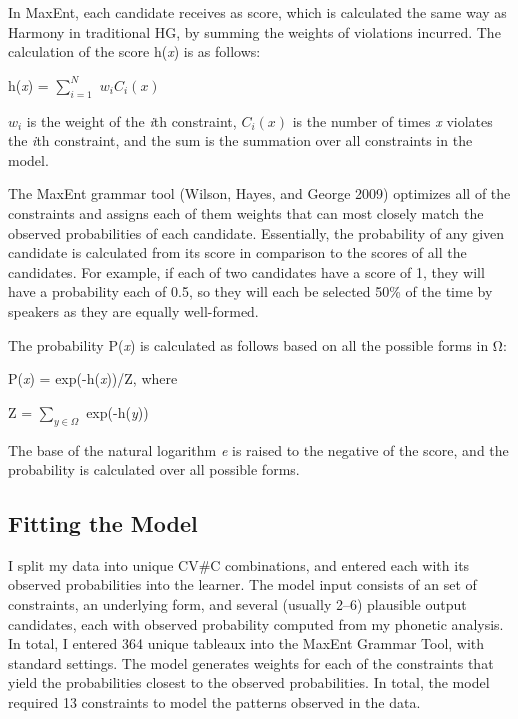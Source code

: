 \documentclass[output=paper,
modfonts
]{langscibook}
\begin{document}
In MaxEnt, each candidate receives as score, which is calculated the same way as Harmony in traditional HG, by summing the weights of violations incurred. The calculation of the score h(\textit{x}) is as follows: 

\ea
h(\textit{x}) = $\sum_{\textit{i}=1}^{\textit{N}}$ ${w_i}{C_i}(x)$

\z

${w_i}$ is the weight of the \textit{i}th constraint, ${C_i}(x)$ is the number of times \textit{x} violates the \textit{i}th constraint, and the sum is the summation over all constraints in the model.  

The MaxEnt grammar tool (Wilson, Hayes, and George 2009) optimizes all of the constraints and assigns each of them weights that can most closely match the observed probabilities of each candidate. Essentially, the probability of any given candidate is calculated from its score in comparison to the scores of all the candidates. For example, if each of two candidates have a score of 1, they will have a probability each of 0.5, so they will each be selected 50\% of the time by speakers as they are equally well-formed.

The probability P(\textit{x}) is calculated as follows based on all the possible forms in Ω:

\ea

P(\textit{x}) = exp(-h(\textit{x}))/Z, where \newline

Z = $\sum_{y\in \varOmega}$ exp(-h(\textit{y}))
\z

The base of the natural logarithm \textit{e} is raised to the negative of the score, and the probability is calculated over all possible forms. 

\subsection{Fitting the Model}

I split my data into unique CV\#C combinations, and entered each with its observed probabilities into the learner. The model input consists of an set of constraints, an underlying form, and several (usually 2--6) plausible output candidates, each with observed probability computed from my phonetic analysis. In total, I entered 364 unique tableaux into the MaxEnt Grammar Tool, with standard settings. The model generates weights for each of the constraints that yield the probabilities closest to the observed probabilities. In total, the model required 13 constraints to model the patterns observed in the data. 
\end{document}
